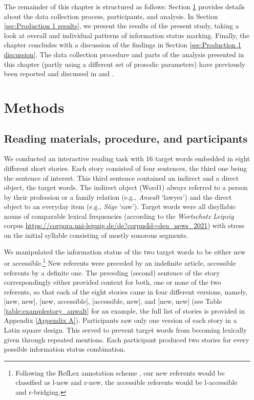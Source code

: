 The remainder of this chapter is structured as follows: Section \ref{sec:Production 1 methods} provides details about the data collection process, participants, and analysis. In Section \ref{sec:Production 1 results}, we present the results of the present study, taking a look at overall and individual patterns of information status marking. Finally, the chapter concludes with a discussion of the findings in Section \ref{sec:Production 1 discussion}. The data collection procedure and parts of the analysis presented in this chapter (partly using a different set of prosodic parameters) have previously been reported and discussed in \citet{lorenzenRedundancyIndividualVariability2023} and \citet{lorenzenParadigmaticSyntagmaticEffects2024}.

\section{Methods} \label{sec:Production 1 methods}

\subsection{Reading materials, procedure, and participants}

We conducted an interactive reading task with 16 target words embedded in eight different short stories. Each story consisted of four sentences, the third one being the sentence of interest. This third sentence contained an indirect and a direct object, the target words. The indirect object (Word1) always referred to a person by their profession or a family relation (e.g., \textit{Anwalt} `lawyer') and the direct object to an everyday item (e.g., \textit{Säge} `saw'). Target words were all disyllabic nouns of comparable lexical frequencies (according to the \textit{Wortschatz Leipzig} corpus \url{https://corpora.uni-leipzig.de/de?corpusId=deu_news_2021}) with stress on the initial syllable consisting of mostly sonorous segments.

We manipulated the information status of the two target words to be either new or accessible.\footnote{Following the RefLex annotation scheme \citep{riesterRefLexSchemeAnnotation2017}, our new referents would be classified as l-new and r-new, the accessible referents would be l-accessible and r-bridging.} New referents were preceded by an indefinite article, accessible referents by a definite one. The preceding (second) sentence of the story correspondingly either provided context for both, one or none of the two referents, so that each of the eight stories came in four different versions, namely, [new, new], [new, accessible], [accessible, new], and [new, new] (see Table \ref{table:examplestory_anwalt} for an example, the full list of stories is provided in Appendix \ref{Appendix A}). Participants saw only one version of each story in a Latin square design. This served to prevent target words from becoming lexically given through repeated mentions. Each participant produced two stories for every possible information status combination.


